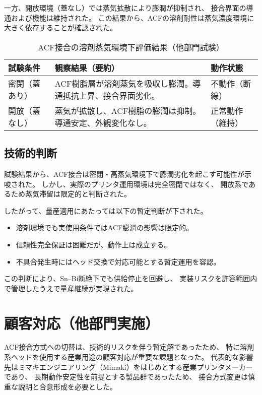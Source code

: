 \documentclass[conference]{IEEEtran}
\begin{document}
一方、開放環境（蓋なし）では蒸気拡散により膨潤が抑制され、  
接合界面の導通および機能は維持された。  
この結果から、ACFの溶剤耐性は蒸気濃度環境に大きく依存することが確認された。

\begin{table}[t]
\centering
\footnotesize
\caption{ACF接合の溶剤蒸気環境下評価結果（他部門試験）}
\label{tab:solvent}
\renewcommand{\arraystretch}{1.1}
\begin{tabularx}{\columnwidth}{@{}p{2.4cm} Y p{2.2cm}@{}}
\toprule
試験条件 & 観察結果（要約） & 動作状態 \\
\midrule
密閉（蓋あり） &
ACF樹脂層が溶剤蒸気を吸収し膨潤。導通抵抗上昇、接合界面劣化。 &
不動作（断線） \\
\addlinespace[2pt]
開放（蓋なし） &
蒸気が拡散し、ACF樹脂の膨潤は抑制。導通安定、外観変化なし。 &
正常動作（維持） \\
\bottomrule
\end{tabularx}
\end{table}

\subsection{技術的判断}
試験結果から、ACF接合は密閉・高蒸気環境下で膨潤劣化を起こす可能性が示唆された。  
しかし、実際のプリンタ運用環境は完全密閉ではなく、  
開放系であるため蒸気滞留は限定的と判断された。  

したがって、量産適用にあたっては以下の暫定判断が下された。

\begin{itemize}
  \item 溶剤環境でも実使用条件ではACF膨潤の影響は限定的。  
  \item 信頼性完全保証は困難だが、動作上は成立する。  
  \item 不具合発生時にはヘッド交換で対応可能とする暫定運用を容認。
\end{itemize}

この判断により、Sn–Bi断絶下でも供給停止を回避し、  
実装リスクを許容範囲内で管理したうえで量産継続が実現された。

\section{顧客対応（他部門実施）}

ACF接合方式への切替は、技術的リスクを伴う暫定解であったため、  
特に溶剤系ヘッドを使用する産業用途の顧客対応が重要な課題となった。  
代表的な影響先はミマキエンジニアリング（Mimaki）をはじめとする産業プリンタメーカーであり、  
長期動作安定性を前提とする製品群であったため、  
接合方式変更は慎重な説明と合意形成を必要とした。
\end{document}
